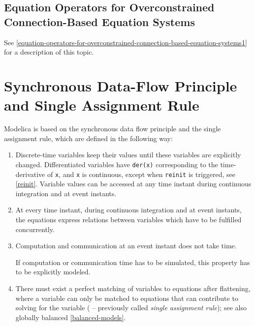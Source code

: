 \subsection{Equation Operators for Overconstrained Connection-Based Equation Systems}\label{equation-operators-for-overconstrained-connection-based-equation-systems}

See \cref{equation-operators-for-overconstrained-connection-based-equation-systems1} for a description of this topic.

\section{Synchronous Data-Flow Principle and Single Assignment Rule}\label{synchronous-data-flow-principle-and-single-assignment-rule}

Modelica is based on the synchronous data flow principle and the single assignment rule, which are defined in the following way:
\begin{enumerate}
\item Discrete-time variables keep their values until these variables are explicitly changed.
Differentiated variables have \lstinline!der(x)! corresponding to the time-derivative of \lstinline!x!,
and \lstinline!x! is continuous, except when \lstinline!reinit! is triggered, see \cref{reinit}.
Variable values can be accessed at any time instant during continuous integration and at event instants.

\item At every time instant, during continuous integration and at event instants,
the equations express relations between variables which have to be fulfilled concurrently.

\item Computation and communication at an event instant does not take time.
\begin{nonnormative}
If computation or communication time has to be simulated, this property has to be explicitly modeled.
\end{nonnormative}

\item There must exist a perfect matching of variables to equations after flattening, where a variable can only be matched to equations that can contribute to solving for the variable
( -- previously called \emph{single assignment rule}); see also globally balanced \cref{balanced-models}.
\end{enumerate}


